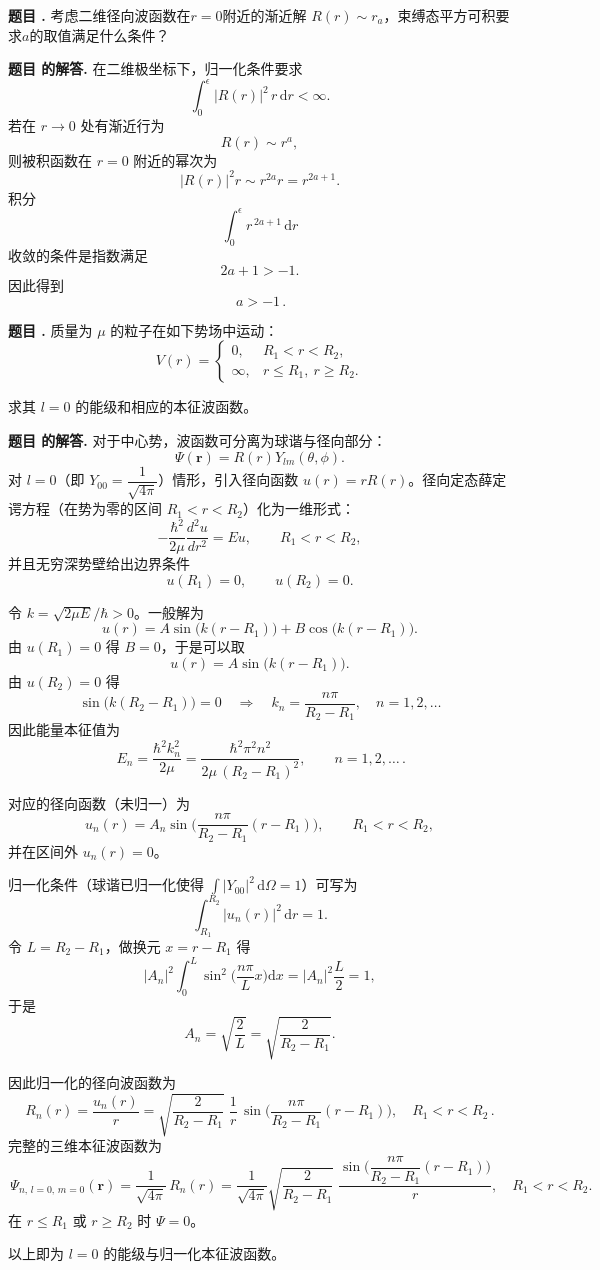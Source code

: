 \documentclass[12pt, a4paper, oneside]{ctexart}
\newcounter{problemname}
\newenvironment{problem}
  {\begin{shaded}\stepcounter{problemname}\par\noindent\textbf{题目 \theproblemname. }}
  {\end{shaded}\par}
\newenvironment{solution}
  {\par\noindent\textbf{题目 \theproblemname 的解答. }}
  {\par}
\begin{document}
\begin{problem}
  考虑二维径向波函数在$ r = 0 $附近的渐近解 $R(r)\sim r_a$，束缚态平方可积要求$ a $的取值满足什么条件？
\end{problem}

\begin{solution}
  在二维极坐标下，归一化条件要求
\[
\int_{0}^{\epsilon} |R(r)|^{2}\, r\, \mathrm{d}r < \infty .
\]
若在 $r\to 0$ 处有渐近行为
\[
R(r) \sim r^{a},
\]
则被积函数在 $r=0$ 附近的幂次为
\[
|R(r)|^{2} r \sim r^{2a} r = r^{2a+1}.
\]
积分
\[
\int_{0}^{\epsilon} r^{\,2a+1}\,\mathrm{d}r
\]
收敛的条件是指数满足
\[
2a+1 > -1.
\]
因此得到
\[
\boxed{\,a > -1\,}.
\]
\end{solution}

\begin{problem}
  质量为 $\mu$ 的粒子在如下势场中运动：
\[
V(r)=
\begin{cases}
0, & R_1< r < R_2,\\[4pt]
\infty, & r\le R_1,\ r\ge R_2.
\end{cases}
\]

求其 $l=0$ 的能级和相应的本征波函数。
\end{problem}

\begin{solution}
对于中心势，波函数可分离为球谐与径向部分：
\[
\Psi(\boldsymbol r)=R(r)Y_{lm}(\theta,\phi).
\]
对 \(l=0\)（即 \(Y_{00}=\dfrac{1}{\sqrt{4\pi}}\)）情形，引入径向函数 \(u(r)=rR(r)\)。径向定态薛定谔方程（在势为零的区间 \(R_1<r<R_2\)）化为一维形式：
\[
-\frac{\hbar^2}{2\mu}\frac{d^2u}{dr^2}=E u,\qquad R_1<r<R_2,
\]
并且无穷深势壁给出边界条件
\[
u(R_1)=0,\qquad u(R_2)=0.
\]

令 \(k=\sqrt{2\mu E}/\hbar>0\)。一般解为
\[
u(r)=A\sin\big(k(r-R_1)\big)+B\cos\big(k(r-R_1)\big).
\]
由 \(u(R_1)=0\) 得 \(B=0\)，于是可以取
\[
u(r)=A\sin\big(k(r-R_1)\big).
\]
由 \(u(R_2)=0\) 得
\[
\sin\big(k(R_2-R_1)\big)=0 \quad\Longrightarrow\quad k_n=\frac{n\pi}{R_2-R_1},\quad n=1,2,\dots
\]
因此能量本征值为
\[
\boxed{\,E_n=\frac{\hbar^2 k_n^2}{2\mu}
=\frac{\hbar^2\pi^2 n^2}{2\mu\,(R_2-R_1)^2},\qquad n=1,2,\dots\,.}
\]

对应的径向函数（未归一）为
\[
u_n(r)=A_n\sin\!\Big(\frac{n\pi}{R_2-R_1}(r-R_1)\Big),\qquad R_1<r<R_2,
\]
并在区间外 \(u_n(r)=0\)。

归一化条件（球谐已归一化使得 \(\int|Y_{00}|^2\,\mathrm d\Omega=1\)）可写为
\[
\int_{R_1}^{R_2}|u_n(r)|^2\,\mathrm d r =1.
\]
令 \(L=R_2-R_1\)，做换元 \(x=r-R_1\) 得
\[
|A_n|^2\int_0^L\sin^2\!\Big(\frac{n\pi}{L}x\Big)\mathrm d x
=|A_n|^2\frac{L}{2}=1,
\]
于是
\[
A_n=\sqrt{\frac{2}{L}}=\sqrt{\frac{2}{R_2-R_1}}.
\]

因此归一化的径向波函数为
\[
\boxed{\,R_n(r)=\frac{u_n(r)}{r}
=\sqrt{\frac{2}{R_2-R_1}}\;\frac{1}{r}\,
\sin\!\Big(\frac{n\pi}{R_2-R_1}(r-R_1)\Big),\quad R_1<r<R_2\,.\,}
\]
完整的三维本征波函数为
\[
\boxed{\,\Psi_{n,\,l=0,\,m=0}(\boldsymbol r)
=\frac{1}{\sqrt{4\pi}}\,R_n(r)
=\frac{1}{\sqrt{4\pi}}\sqrt{\frac{2}{R_2-R_1}}\;
\frac{\sin\!\big(\dfrac{n\pi}{R_2-R_1}(r-R_1)\big)}{r},\quad R_1<r<R_2. \,}
\]
在 \(r\le R_1\) 或 \(r\ge R_2\) 时 \(\Psi=0\)。

以上即为 \(l=0\) 的能级与归一化本征波函数。
\end{solution}
\end{document}
